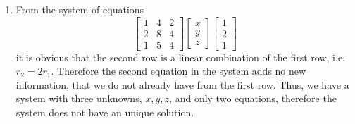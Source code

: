 \begin{enumerate}[label=(\alph*)]
    \item 
        \begin{mdframed}[style=MyFrame]
            From the system of equations
            \begin{equation}
                \begin{bmatrix}
                    1   & 4     &       2   \\
                    2   & 8     &       4   \\
                    1   & 5     &       4   
                \end{bmatrix}
                \begin{bmatrix}
                    x   \\
                    y   \\
                    z
                \end{bmatrix}
                \begin{bmatrix}
                    1   \\
                    2   \\
                    1
                \end{bmatrix}
            \end{equation}
            it is obvious that the second row is a linear
            combination of the first row, i.e. $r_{2}=2r_{1}$. Therefore the
            second equation in the system adds no new information, that we do
            not already have from the first row. Thus, we have a system with
            three unknowns, $x,y,z$, and only two equations, therefore the
            system does not have an unique solution.    
        \end{mdframed}
    

\end{enumerate}

